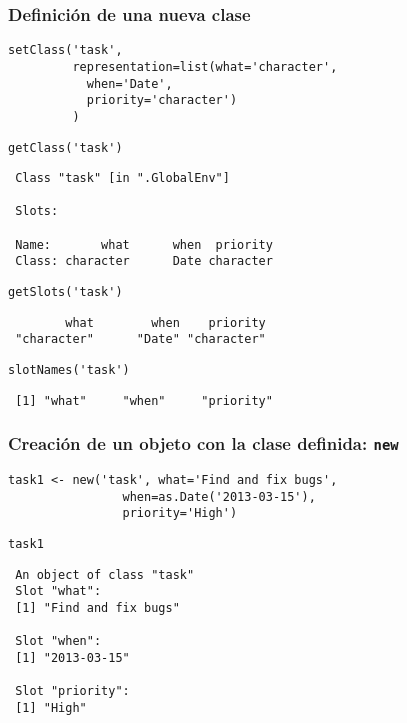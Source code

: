 \documentclass[xcolor={usenames,svgnames,dvipsnames}]{beamer}
\begin{document}
\begin{frame}[fragile]
\frametitle{Definición de una nueva clase}
\label{sec-3-1-2}


\lstset{language=R}
\begin{lstlisting}
setClass('task',
         representation=list(what='character',
           when='Date',
           priority='character')
         )
\end{lstlisting}



\lstset{language=R}
\begin{lstlisting}
getClass('task')
\end{lstlisting}

\begin{verbatim}
 Class "task" [in ".GlobalEnv"]
 
 Slots:
                                     
 Name:       what      when  priority
 Class: character      Date character
\end{verbatim}


\lstset{language=R}
\begin{lstlisting}
getSlots('task')
\end{lstlisting}

\begin{verbatim}
        what        when    priority 
 "character"      "Date" "character"
\end{verbatim}


\lstset{language=R}
\begin{lstlisting}
slotNames('task')
\end{lstlisting}

\begin{verbatim}
 [1] "what"     "when"     "priority"
\end{verbatim}
\end{frame}
\begin{frame}[fragile]
\frametitle{Creación de un objeto con la clase definida: \texttt{new}}
\label{sec-3-1-3}



\lstset{language=R}
\begin{lstlisting}
task1 <- new('task', what='Find and fix bugs',
                when=as.Date('2013-03-15'),
                priority='High')
\end{lstlisting}



\lstset{language=R}
\begin{lstlisting}
task1
\end{lstlisting}

\begin{verbatim}
 An object of class "task"
 Slot "what":
 [1] "Find and fix bugs"
 
 Slot "when":
 [1] "2013-03-15"
 
 Slot "priority":
 [1] "High"
\end{verbatim}
\end{frame}
\end{document}

